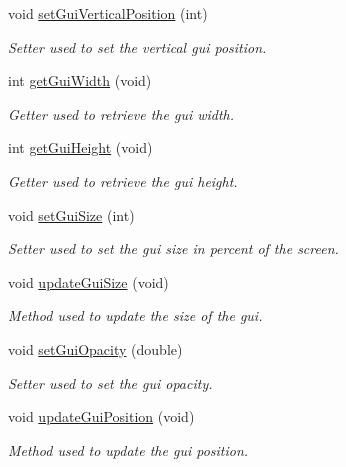 \begin{DoxyCompactItemize}
void \mbox{\hyperlink{class_autoscope_picture_window_form_a687966c09f4fe03caa2b52c42a804ae1}{set\+Gui\+Vertical\+Position}} (int)
\begin{DoxyCompactList}\small\item\em Setter used to set the vertical gui position. \end{DoxyCompactList}\item 
int \mbox{\hyperlink{class_autoscope_picture_window_form_a7e8d04d5bf4eafc415a9d6176a2325e9}{get\+Gui\+Width}} (void)
\begin{DoxyCompactList}\small\item\em Getter used to retrieve the gui width. \end{DoxyCompactList}\item 
int \mbox{\hyperlink{class_autoscope_picture_window_form_ad3fa8efcfcc0631f8b646500fb5cea65}{get\+Gui\+Height}} (void)
\begin{DoxyCompactList}\small\item\em Getter used to retrieve the gui height. \end{DoxyCompactList}\item 
void \mbox{\hyperlink{class_autoscope_picture_window_form_ae968436e14e51184ca0f375f04947d4c}{set\+Gui\+Size}} (int)
\begin{DoxyCompactList}\small\item\em Setter used to set the gui size in percent of the screen. \end{DoxyCompactList}\item 
void \mbox{\hyperlink{class_autoscope_picture_window_form_a8c0ca53b5ca0a741cf240a0c07870bfe}{update\+Gui\+Size}} (void)
\begin{DoxyCompactList}\small\item\em Method used to update the size of the gui. \end{DoxyCompactList}\item 
void \mbox{\hyperlink{class_autoscope_picture_window_form_acb47c88be96f7b6573cd6181d6e3865e}{set\+Gui\+Opacity}} (double)
\begin{DoxyCompactList}\small\item\em Setter used to set the gui opacity. \end{DoxyCompactList}\item 
void \mbox{\hyperlink{class_autoscope_picture_window_form_aa9b0990a5e7fa9d0bedeaab959b999c6}{update\+Gui\+Position}} (void)
\begin{DoxyCompactList}\small\item\em Method used to update the gui position. \end{DoxyCompactList}\item 

\end{DoxyCompactItemize}
